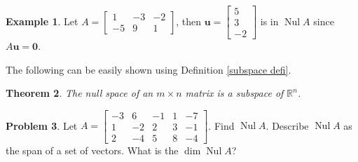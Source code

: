 \documentclass[12pt,letterpaper]{book}
\numberwithin{equation}{section}
\newtheorem{thm}{\textbf{Theorem}}[section]
\theoremstyle{definition}
\newtheorem{problem}[thm]{\textbf{Problem}}
\newtheorem{example}[thm]{\textbf{Example}}
\newcommand{\vu}{\bm{u}}
\newcommand{\veczero}{\bm{0}}
\newcommand{\Nul}{\operatorname{Nul}}
\begin{document}
\begin{example} Let $A=\left[\begin{array}{rrr} 1 & -3 & -2 \\ -5 & 9
& 1 \end{array}\right]$, then $\vu=\left[\begin{array}{r} 5 \\ 3
\\ -2 \end{array}\right]$ is in $\Nul A$ since $A\vu=\veczero$.
\end{example}

The following can be easily shown using Definition \ref{subspace defi}.

\begin{thm} The null space of an $m\times n$ matrix is a
subspace of $\mathbb{R}^n$.
\end{thm}

\begin{problem}\label{nullsp example} Let $A=\left[\begin{array}{rrrrr} -3 & 6 & -1 & 1 & -7
\\ 1 & -2 & 2 & 3 & -1 \\ 2 & -4 & 5 & 8 & -4
\end{array}\right]$. Find $\Nul A$. Describe $\Nul A$ as the span of a set of vectors. What is the $\dim \Nul A$?
\end{problem}
\end{document}
